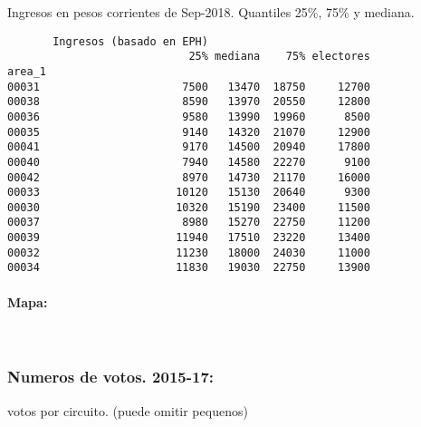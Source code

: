\documentclass[11pt]{article}
\begin{document}
    
    Ingresos en pesos corrientes de Sep-2018. Quantiles 25\%, 75\% y
mediana.

    
    
    \begin{verbatim}
       Ingresos (basado en EPH)                         
                            25% mediana    75% electores
area_1                                                  
00031                      7500   13470  18750     12700
00038                      8590   13970  20550     12800
00036                      9580   13990  19960      8500
00035                      9140   14320  21070     12900
00041                      9170   14500  20940     17800
00040                      7940   14580  22270      9100
00042                      8970   14730  21170     16000
00033                     10120   15130  20640      9300
00030                     10320   15190  23400     11500
00037                      8980   15270  22750     11200
00039                     11940   17510  23220     13400
00032                     11230   18000  24030     11000
00034                     11830   19030  22750     13900
    \end{verbatim}

    
    \hypertarget{mapa}{%
\paragraph{Mapa:}\label{mapa}}

    
    \begin{center}
    \end{center}
    { \hspace*{\fill} \\}
    
    \hypertarget{numeros-de-votos.-2015-17}{%
\subsubsection{Numeros de votos.
2015-17:}\label{numeros-de-votos.-2015-17}}

    
    votos por circuito. (puede omitir pequenos)

    
    
\end{document}
